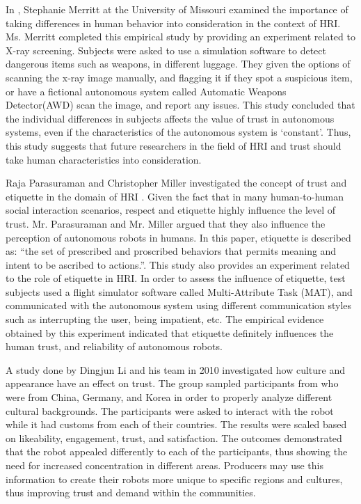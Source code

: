\documentclass[runningheads,a4paper]{llncs}
\begin{document}
In \cite{merritt2008not}, Stephanie Merritt at the University of Missouri examined the importance of taking differences in human behavior into consideration in the context of HRI. Ms. Merritt completed this empirical study by providing an experiment related to  X-ray screening. Subjects were asked to use a simulation software to detect dangerous items such as weapons, in different luggage. They given the options of scanning the x-ray image manually, and flagging it if they spot a suspicious item, or have a fictional autonomous system called  Automatic Weapons Detector(AWD) scan the image, and report any issues. This study concluded that the individual differences in subjects affects the value of trust in autonomous systems, even if the characteristics of the autonomous system is `constant'. Thus, this study suggests that future researchers in the field of HRI and trust should take human characteristics into consideration.

Raja Parasuraman and Christopher Miller investigated the concept of trust and etiquette in the domain of HRI \cite{parasuraman2004trust}. Given the fact that in many human-to-human social interaction scenarios, respect and etiquette highly influence the level of trust. Mr. Parasuraman and Mr. Miller argued that they also influence the perception of autonomous robots in humans. In this paper, etiquette is described as: ``the set of prescribed and proscribed behaviors
that permits meaning and intent to be ascribed to
actions.''. This study also provides an experiment related to the role of etiquette in HRI. In order to assess the influence of etiquette, test subjects used a flight simulator software called Multi-Attribute Task (MAT), and communicated with the autonomous system using different communication styles such as interrupting the user, being impatient, etc. The empirical evidence obtained by this experiment indicated that etiquette definitely influences the human trust, and reliability of autonomous robots.

A study done by Dingjun Li and his team in 2010 investigated how culture and appearance have an effect on trust\cite{li2010cross}.  The group sampled participants from who were from China, Germany, and Korea in order to properly analyze different cultural backgrounds.  The participants were asked to interact with the robot while it had customs from each of their countries.  The results were scaled based on likeability, engagement, trust, and satisfaction.  The outcomes demonstrated that the robot appealed differently to each of the participants, thus showing the need for increased concentration in different areas.  Producers may use this information to create their robots more unique to specific regions and cultures, thus improving trust and demand within the communities.
\end{document}
